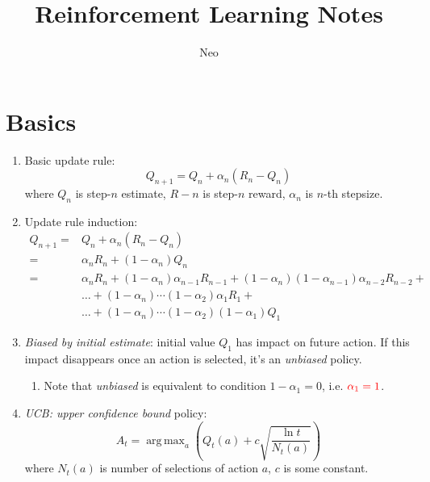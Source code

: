 \documentclass{article}
\DeclareMathOperator*{\argmax}{arg\,max}
\begin{document}
\title{Reinforcement Learning Notes}
\author{Neo}
\date{}
\maketitle

\tableofcontents

\section{Basics}

\begin{enumerate}
  \item Basic update rule:
    \[ Q_{n+1} = Q_n + \alpha_n (R_n-Q_n)\]
    where \(Q_n\) is step-\(n\) estimate, \(R-n\) is step-\(n\) reward, \(\alpha_n\) is \(n\)-th stepsize.
  \item Update rule induction:
    \begin{align*}
      Q_{n+1}= & Q_n + \alpha_{n} (R_n - Q_n)                                                                              \\
      =        & \alpha_{n}R_n + (1-\alpha_{n})Q_n                                                                         \\
      =        & \alpha_{n}R_n + (1-\alpha_{n})\alpha_{n-1} R_{n-1} + (1-\alpha_{n})(1-\alpha_{n-1})\alpha_{n-2} R_{n-2} + \\
               & \dots + (1-\alpha_{n})\cdots(1-\alpha_{2})\alpha_1 R_1 +                                                  \\
               & \dots + (1-\alpha_{n})\cdots(1-\alpha_{2})(1-\alpha_1) Q_1
    \end{align*}
  \item \emph{Biased by initial estimate}: initial value \(Q_1\) has impact on future action. If this impact disappears once an action is selected, it's an \emph{unbiased} policy.
    \begin{enumerate}
      \item Note that \emph{unbiased} is equivalent to condition \(1-\alpha_1 = 0\), i.e. \(\color{red}\alpha_1=1\).
    \end{enumerate}
  \item \emph{UCB: upper confidence bound} policy:
    \[ A_t = \argmax_a \left(Q_t(a) + c \sqrt{\frac{\ln t}{N_t(a)}} \right) \]
    where \(N_t(a)\) is number of selections of action \(a\), \(c\) is some constant.
\end{enumerate}
\end{document}
